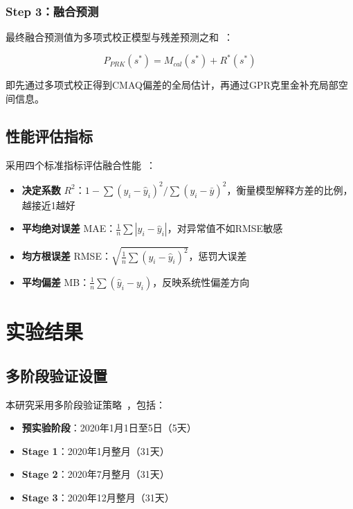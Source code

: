 \documentclass[UTF8, a4paper, 12pt]{article}
\begin{document}
\subsubsection{Step 3：融合预测}

最终融合预测值为多项式校正模型与残差预测之和~\cite{wan2022fusion}：

\begin{equation}
P_{PRK}(s^*) = M_{cal}(s^*) + R^*(s^*)
\end{equation}

即先通过多项式校正得到CMAQ偏差的全局估计，再通过GPR克里金补充局部空间信息。

\subsection{性能评估指标}

采用四个标准指标评估融合性能~\cite{liu2019spatial}：

\begin{itemize}
    \item \textbf{决定系数} $R^2$：$1 - \sum(y_i - \hat{y}_i)^2 / \sum(y_i - \bar{y})^2$，衡量模型解释方差的比例，越接近1越好

    \item \textbf{平均绝对误差} MAE：$\frac{1}{n}\sum|y_i - \hat{y}_i|$，对异常值不如RMSE敏感

    \item \textbf{均方根误差} RMSE：$\sqrt{\frac{1}{n}\sum(y_i - \hat{y}_i)^2}$，惩罚大误差

    \item \textbf{平均偏差} MB：$\frac{1}{n}\sum(\hat{y}_i - y_i)$，反映系统性偏差方向
\end{itemize}

\section{实验结果}

\subsection{多阶段验证设置}

本研究采用多阶段验证策略~\cite{rodriguez2025downscaling}，包括：

\begin{itemize}
    \item \textbf{预实验阶段}：2020年1月1日至5日（5天）
    \item \textbf{Stage 1}：2020年1月整月（31天）
    \item \textbf{Stage 2}：2020年7月整月（31天）
    \item \textbf{Stage 3}：2020年12月整月（31天）
\end{itemize}
\end{document}
